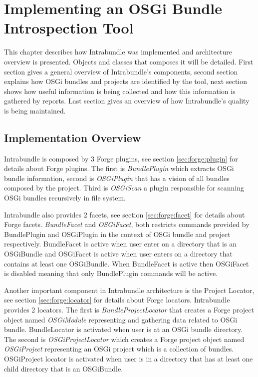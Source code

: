 \chapter{Implementing an OSGi Bundle Introspection Tool}
This chapter describes how Intrabundle was implemented and architecture overview is presented. Objects and classes that composes it will be detailed. First section gives a general overview of Intrabundle's components, second section explains how OSGi bundles and projects are identified by the tool, next section shows how useful information is being collected and how this information is gathered by reports. Last section gives an overview of how Intrabundle's quality is being maintained.   

\section{Implementation Overview}

Intrabundle is composed by 3 Forge plugins, see section \ref{sec:forge:plugin} for details about Forge plugins. The first is \emph{BundlePlugin} which extracts OSGi bundle information, second is \emph{OSGiPlugin} that has a vision of all bundles composed by the project. Third is \emph{OSGiScan} a plugin responsible for scanning OSGi bundles recursively in file system. 


Intrabundle also provides 2 facets, see section \ref{sec:forge:facet} for details about Forge facets. \emph{BundleFacet} and \emph{OSGiFacet}, both restricts commands provided by BundlePlugin and OSGiPlugin in the context of OSGi bundle and project respectively. BundleFacet is active when user enter on a directory that is an OSGiBundle and OSGiFacet is active when user enters on a directory that contains at least one OSGiBundle. When BundleFacet is active then OSGiFacet is disabled meaning that only BundlePlugin commands will be active.

Another important component in Intrabundle architecture is the Project Locator, see section \ref{sec:forge:locator} for details about Forge locators. Intrabundle provides 2 locators. The first is \emph{BundleProjectLocator} that creates a Forge project object named \emph{OSGiModule} representing and gathering data related to OSGi bundle. BundleLocator is activated when user is at an OSGi bundle directory. The second is \emph{OSGiProjectLocator} which creates a Forge project object named \emph{OSGiProject} representing an OSGi project which is a collection of bundles. OSGiProject locator is activated when user is in a directory that has at least one child directory that is an OSGiBundle.         

